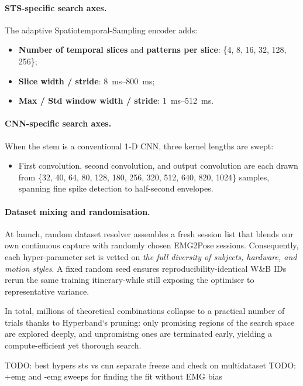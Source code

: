 \paragraph{STS-specific search axes.}
The adaptive Spatiotemporal-Sampling encoder adds:

\begin{itemize}
  \item \textbf{Number of temporal slices} and \textbf{patterns per slice}:
        \{4, 8, 16, 32, 128, 256\};
  \item \textbf{Slice width / stride}: \SIrange{8}{800}{ms};
  \item \textbf{Max / Std window width / stride}:
        \SIrange{1}{512}{ms}.
\end{itemize}

\paragraph{CNN-specific search axes.}
When the stem is a conventional 1-D CNN, three kernel lengths are swept:

\begin{itemize}
  \item First convolution, second convolution, and output convolution are each
        drawn from
        \{32, 40, 64, 80, 128, 180, 256, 320, 512, 640, 820, 1024\} samples,
        spanning fine spike detection to half-second envelopes.
\end{itemize}

\paragraph{Dataset mixing and randomisation.}
At launch, random dataset resolver assembles a fresh session list that blends our own
continuous capture with randomly chosen EMG2Pose sessions.
Consequently, each hyper-parameter set is vetted on \emph{the full diversity of
subjects, hardware, and motion styles}.
A fixed random seed ensures reproducibility-identical W\&B IDs rerun the same
training itinerary-while still exposing the optimiser to representative
variance.

In total, millions of theoretical combinations collapse to a practical number
of trials thanks to Hyperband`s pruning: only promising regions of the search
space are explored deeply, and unpromising ones are terminated early, yielding
a compute-efficient yet thorough search.

TODO: best hypers sts vs cnn separate freeze and check on multidataset
TODO: +emg and -emg sweeps for finding the fit without EMG bias